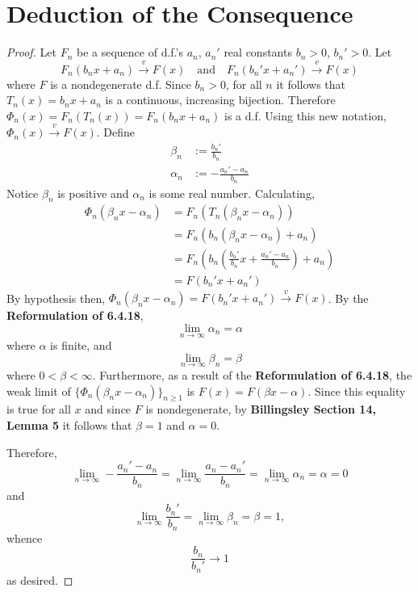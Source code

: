 \documentclass[letterpaper, 12pt]{article}
\begin{document}
\section*{Deduction of the Consequence}
\begin{proof}
Let $F_n$ be a sequence of d.f.'s $a_n$, $a_n'$ real constants $b_n > 0$, $b_n' > 0$.
Let
\begin{equation*}
F_n(b_n x + a_n) \xrightarrow{v} F(x)
\quad
\text{and}
\quad
F_n(b_n'x + a_n') \xrightarrow{v} F(x)
\end{equation*}
where $F$ is a nondegenerate d.f. Since $b_n > 0$, for all $n$ it follows that $T_n(x) = b_n x + a_n$ is a continuous, increasing bijection. 
Therefore $\Phi_n(x) = F_n(T_n(x)) = F_n(b_n x + a_n)$ is a d.f. Using this new notation, $\Phi_n(x) \xrightarrow{v} F(x)$. Define
\begin{align*}
\beta_n &:= \frac{b_n'}{b_n}
\\
\alpha_n &:= -\frac{a_n' - a_n}{b_n}
\end{align*}
Notice $\beta_n$ is positive and $\alpha_n$ is some real number.
Calculating,
\begin{align*}
\Phi_n(\beta_n x - \alpha_n) 
&=
F_n(T_n(\beta_n x - \alpha_n))
\\
&=
F_n(b_n(\beta_n x - \alpha_n) + a_n)
\\
&=
F_n
\left(
b_n
\left(
\frac{b_n'}{b_n} x + \frac{a_n' - a_n}{b_n}
\right)
+ a_n
\right)
\\
&=
F(b_n' x + a_n')
\end{align*}
By hypothesis then, $\Phi_n(\beta_n x -\alpha_n) = F(b_n'x + a_n') \xrightarrow{v} F(x)$. 
By the \textbf{Reformulation of 6.4.18}, 
\[
\lim_{n \to \infty} \alpha_n = \alpha
\]
where $\alpha$ is finite, and 
\[
\lim_{n \to \infty} \beta_n = \beta
\]
where $0 < \beta < \infty$. Furthermore, as a result of the \textbf{Reformulation of 6.4.18}, 
the weak limit of $\{\Phi_n(\beta_n x -\alpha_n)\}_{n \geq 1}$ is $F(x) = F(\beta x - \alpha)$. Since this equality is true for all $x$ and since $F$ is nondegenerate, by \textbf{Billingsley Section 14, Lemma 5} it follows that $\beta = 1$ and $\alpha=0$.

Therefore,
\[
\lim_{n \to \infty}
-\frac{a_n' - a_n}{b_n}
=
\lim_{n \to \infty} \frac{a_n - a_n'}{b_n} 
=
\lim_{n \to \infty} \alpha_n 
= 
\alpha 
= 
0
\]
and
\[
\lim_{n \to \infty} \frac{b_n'}{b_n}
=
\lim_{n \to \infty} \beta_n 
= 
\beta
=
1,
\]
whence
\[
\frac{b_n}{b_n'} \to 1
\]
as desired.
\end{proof}
\end{document}
